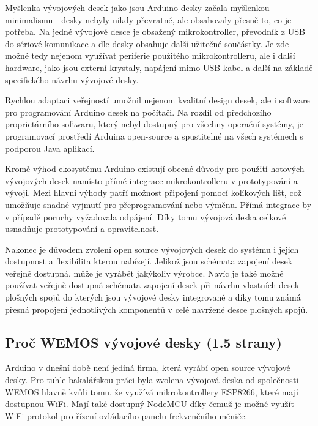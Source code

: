Myšlenka vývojových desek jako jsou Arduino desky začala myšlenkou minimalismu - desky nebyly nikdy převratné, ale obsahovaly přesně to, co je potřeba.
Na jedné vývojové desce je obsažený mikrokontroller, převodník z USB do sériové komunikace a dle desky obsahuje další užitečné součástky. Je zde možné tedy nejenom využívat periferie použitého mikrokontrolleru, ale i další hardware, jako jsou externí krystaly, napájení mimo USB kabel a další na základě specifického návrhu vývojové desky.
\cite{KnihaOArduinu}

Rychlou adaptaci veřejností umožnil nejenom kvalitní design desek, ale i software pro programování Arduino desek na počítači. Na rozdíl od předchozího proprietárního softwaru, který nebyl dostupný pro všechny operační systémy, je programovací prostředí Arduina open-source a spustitelné na všech systémech s podporou Java aplikací. 
\cite{KnihaOArduinu}

Kromě výhod ekosystému Arduino existují obecné důvody pro použití hotových vývojových desek namísto přímé integrace mikrokontrolleru v prototypování a vývoji. Mezi hlavní výhody patří možnost připojení pomocí kolíkových lišt, což umožňuje snadné vyjmutí pro přeprogramování nebo výměnu. Přímá integrace by v případě poruchy vyžadovala odpájení. Díky tomu vývojová deska celkově usnadňuje prototypování a opravitelnost.

Nakonec je důvodem zvolení open source vývojových desek do systému i jejich dostupnost a flexibilita kterou nabízejí. Jelikož jsou schémata zapojení desek veřejně dostupná, může je vyrábět jakýkoliv výrobce. Navíc je také možné používat veřejně dostupná schémata zapojení desek při návrhu vlastních desek plošných spojů do kterých jsou vývojové desky integrované a díky tomu známá přesná propojení jednotlivých komponentů v celé navržené desce plošných spojů.

\subsection{Proč WEMOS vývojové desky (1.5 strany)}

Arduino v dnešní době není jediná firma, která vyrábí open source vývojové desky. Pro tuhle bakalářskou práci byla zvolena vývojová deska od společnosti WEMOS hlavně kvůli tomu, že využívá mikrokontrollery ESP8266, které mají dostupnou WiFi. Mají také dostupný NodeMCU díky čemuž je možné využít WiFi protokol pro řízení ovládacího panelu frekvenčního měniče.

